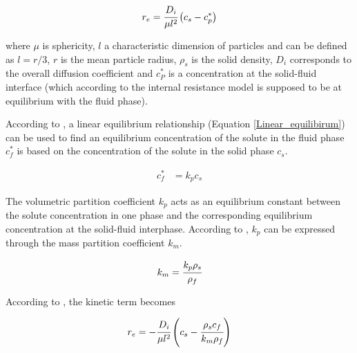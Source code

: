 \documentclass[../Article_Model_Parameters.tex]{subfiles}
\begin{document}
			{\footnotesize
				\begin{equation} \label{Model_kinetic_basic}
					r_e = \cfrac{D_i}{\mu l^2 }\left(c_s - c_p^* \right)
			\end{equation} }
			
			where $\mu$ is sphericity, $l$ a characteristic dimension of particles and can be defined as $l = r/3$, $r$ is the mean particle radius, $\rho_s$ is the solid density, $D_i$ corresponds to the overall diffusion coefficient and $c_P^*$ is a concentration at the solid-fluid interface (which according to the internal resistance model is supposed to be at equilibrium with the fluid phase). 
			
			According to \citet{Bulley1984}, a linear equilibrium relationship (Equation  \ref{Linear_equilibirum}) can be used to find an equilibrium concentration of the solute in the fluid phase $c_f^*$ is based on the concentration of the solute in the solid phase $c_s$.
			
			{\footnotesize
				\begin{align} \label{Linear_equilibirum}
					c_f^* &= k_p c_s
			\end{align} }
			
			The volumetric partition coefficient $k_p$ acts as an equilibrium constant between the solute concentration in one phase and the corresponding equilibrium concentration at the solid-fluid interphase. According to \citet{Spiro2007}, $k_p$ can be expressed through the mass partition coefficient $k_m$.
			
			{\footnotesize
				\begin{align}
					k_m = \cfrac{k_p \rho_s}{\rho_f}
			\end{align} }
			
			According to \citet{Reverchon1996}, the kinetic term becomes
			
			{\footnotesize
				\begin{equation}
					\label{Model_kinetic_no_sat}
					r_e = -\cfrac{D_i}{ \mu l^2 } \left(c_s - \cfrac{\rho_s c_f}{k_m \rho_f} \right)
			\end{equation} }
			
			
			
			
\end{document}
